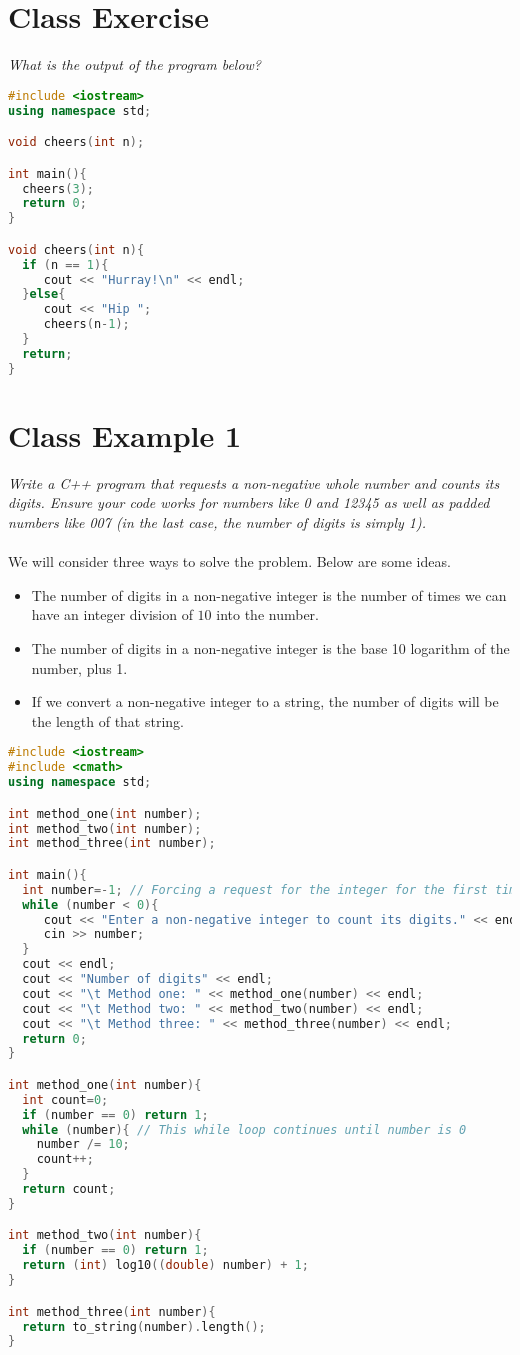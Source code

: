 \documentclass[9pt]{amsart}
\begin{document}
\section{Class Exercise}
\textit{What is the output of the program below?
}\begin{lstlisting}[language=C++]
#include <iostream>
using namespace std;

void cheers(int n);

int main(){
  cheers(3);
  return 0;
}

void cheers(int n){
  if (n == 1){
     cout << "Hurray!\n" << endl;
  }else{
     cout << "Hip ";
     cheers(n-1);
  }
  return;
}
\end{lstlisting}

\section{Class Example 1}
\textit{Write a C++ program that requests a non-negative whole number and counts its digits. Ensure your code works for numbers like 0 and 12345 as well as padded numbers like 007 (in the last case, the number of digits is simply 1).}
\\ \\
We will consider three ways to solve the problem. Below are some ideas.
\begin{itemize}
\item 
The number of digits in a non-negative integer is the number of times we can have an integer division of $10$ into the number.
\item The number of digits in a non-negative integer is the base 10 logarithm of the number, plus 1.
\item If we convert a non-negative integer to a string, the number of digits will be the length of that string.
\end{itemize}
\begin{lstlisting}[language=C++]
#include <iostream>
#include <cmath>
using namespace std;

int method_one(int number);
int method_two(int number);
int method_three(int number);

int main(){
  int number=-1; // Forcing a request for the integer for the first time
  while (number < 0){
     cout << "Enter a non-negative integer to count its digits." << endl;
     cin >> number;      
  }
  cout << endl;
  cout << "Number of digits" << endl;
  cout << "\t Method one: " << method_one(number) << endl;
  cout << "\t Method two: " << method_two(number) << endl;
  cout << "\t Method three: " << method_three(number) << endl;
  return 0;
}

int method_one(int number){
  int count=0;
  if (number == 0) return 1;
  while (number){ // This while loop continues until number is 0
    number /= 10;
    count++;
  }
  return count;
}

int method_two(int number){
  if (number == 0) return 1;
  return (int) log10((double) number) + 1;
}

int method_three(int number){
  return to_string(number).length();
}
\end{lstlisting}
\end{document}
